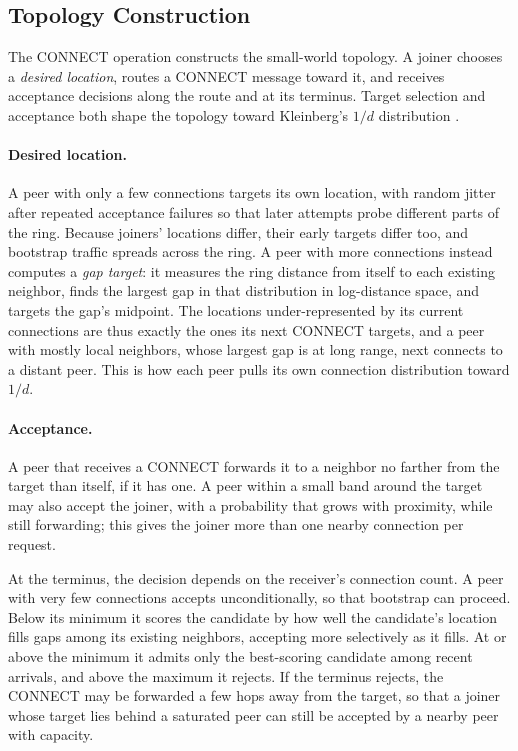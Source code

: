 \subsection{Topology Construction}

The \textsf{CONNECT} operation constructs the small-world topology. A joiner chooses a \emph{desired location}, routes a \textsf{CONNECT} message toward it, and receives acceptance decisions along the route and at its terminus. Target selection and acceptance both shape the topology toward Kleinberg's $1/d$ distribution \citep{kleinberg2000small}.



\paragraph{Desired location.} A peer with only a few connections targets its own location, with random jitter after repeated acceptance failures so that later attempts probe different parts of the ring. Because joiners' locations differ, their early targets differ too, and bootstrap traffic spreads across the ring. A peer with more connections instead computes a \emph{gap target}: it measures the ring distance from itself to each existing neighbor, finds the largest gap in that distribution in log-distance space, and targets the gap's midpoint. The locations under-represented by its current connections are thus exactly the ones its next \textsf{CONNECT} targets, and a peer with mostly local neighbors, whose largest gap is at long range, next connects to a distant peer. This is how each peer pulls its own connection distribution toward $1/d$.

\paragraph{Acceptance.} A peer that receives a \textsf{CONNECT} forwards it to a neighbor no farther from the target than itself, if it has one. A peer within a small band around the target may also accept the joiner, with a probability that grows with proximity, while still forwarding; this gives the joiner more than one nearby connection per request.

At the terminus, the decision depends on the receiver's connection count. A peer with very few connections accepts unconditionally, so that bootstrap can proceed. Below its minimum it scores the candidate by how well the candidate's location fills gaps among its existing neighbors, accepting more selectively as it fills. At or above the minimum it admits only the best-scoring candidate among recent arrivals, and above the maximum it rejects. If the terminus rejects, the \textsf{CONNECT} may be forwarded a few hops away from the target, so that a joiner whose target lies behind a saturated peer can still be accepted by a nearby peer with capacity.

